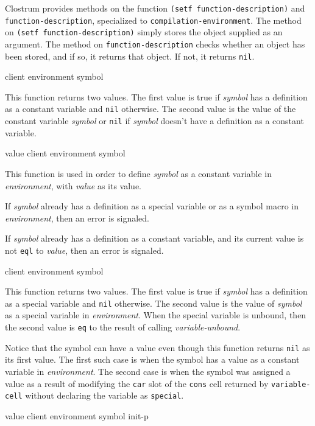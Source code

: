Clostrum provides methods on the function \texttt{(setf
  function-description)} and \texttt{function-description},
specialized to \texttt{compilation-environment}.  The method on
\texttt{(setf function-description)} simply stores the object supplied
as an argument.  The method on \texttt{function-description} checks
whether an object has been stored, and if so, it returns that object.
If not, it returns \texttt{nil}.

 {client environment symbol}

This function returns two values. The first value is true if \textit{symbol}
has a definition as a constant variable and \texttt{nil} otherwise. The second
value is the value of the constant variable \textit{symbol} or \texttt{nil} if
\textit{symbol} doesn't have a definition as a constant variable.

 {value client environment symbol}

This function is used in order to define \textit{symbol} as a constant
variable in \textit{environment}, with \textit{value} as its value.

If \textit{symbol} already has a definition as a special variable or
as a symbol macro in \textit{environment}, then an error is signaled.

If \textit{symbol} already has a definition as a constant variable,
and its current value is not \texttt{eql} to \textit{value}, then an
error is signaled.

 {client environment symbol}

This function returns two values. The first value is true if
\textit{symbol} has a definition as a special variable and
\texttt{nil} otherwise. The second value is the value of
\textit{symbol} as a special variable in \textit{environment}. When
the special variable is unbound, then the second value is \texttt{eq}
to the result of calling \textit{variable-unbound}.

Notice that the symbol can have a value even though this function
returns \texttt{nil} as its first value.  The first such case is when
the symbol has a value as a constant variable in \textit{environment}.
The second case is when the symbol was assigned a value as a result of
modifying the \texttt{car} slot of the \texttt{cons} cell returned by
\texttt{variable-cell} without declaring the variable as
\texttt{special}.

 {value client environment symbol init-p}

